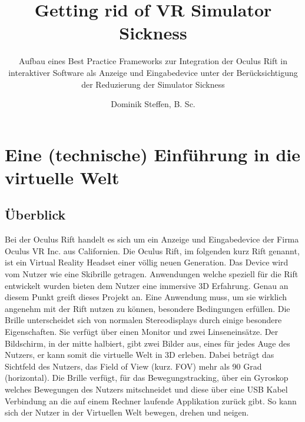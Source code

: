 \documentclass[pagesize, paper=a4, fontsize=12pt,titlepage=true, headings=small, headnosepline, abstractoff, liststotoc, nochapterprefix, plainheadsepline]{scrreprt}
\author{
Dominik Steffen, B. Sc.
}
\title{Getting rid of VR Simulator Sickness}
\subtitle{Aufbau eines Best Practice Frameworks zur Integration der Oculus Rift in interaktiver Software als Anzeige und Eingabedevice unter der Berücksichtigung der Reduzierung der Simulator Sickness}
\begin{document}
\maketitle
%


\begingroup
	\tableofcontents
	\thispagestyle{empty}
\endgroup


\renewcommand*{\chapterpagestyle}{plain}
\pagestyle{plain}
\setcounter{page}{0}

\chapter{Eine (technische) Einführung in die virtuelle Welt}

\section{Überblick}
Bei der Oculus Rift handelt es sich um ein Anzeige und Eingabedevice der Firma Oculus VR Inc. aus Californien. Die Oculus Rift, im folgenden kurz Rift genannt, ist ein Virtual Reality Headset einer völlig neuen Generation. Das Device wird vom Nutzer wie eine Skibrille getragen. Anwendungen welche speziell für die Rift entwickelt wurden bieten dem Nutzer eine immersive 3D Erfahrung. Genau an diesem Punkt greift dieses Projekt an. Eine Anwendung muss, um sie wirklich angenehm mit der Rift nutzen zu können, besondere Bedingungen erfüllen. Die Brille unterscheidet sich von normalen Stereodisplays durch einige besondere Eigenschaften. Sie verfügt über einen Monitor und zwei Linseneinsätze. Der Bildschirm, in der mitte halbiert, gibt zwei Bilder aus, eines für jedes Auge des Nutzers, er kann somit die virtuelle Welt in 3D erleben. Dabei beträgt das Sichtfeld des Nutzers, das Field of View (kurz. FOV) mehr als 90 Grad (horizontal). Die Brille verfügt, für das Bewegungstracking, über ein Gyroskop welches Bewegungen des Nutzers mitschneidet und diese über eine USB Kabel Verbindung an die auf einem Rechner laufende Applikation zurück gibt. So kann sich der Nutzer in der Virtuellen Welt bewegen, drehen und neigen.
\end{document}
